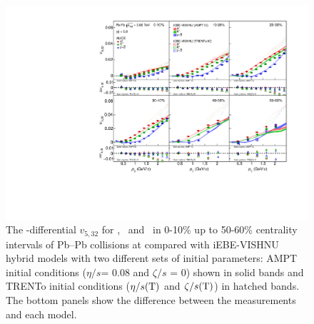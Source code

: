 \documentclass[ALICE,manyauthors]{cernphprep}
\begin{document}
\begin{figure}[h]
\begin{center}
\includegraphics[scale=0.73]{figures/model/TrentoAndAMPT_v523_gap00_PID2.pdf}
\end{center}
\caption{The \pT-differential $v_{5,32}$ for \pion, \kaon~and \proton~in 0-10\% up to 50-60\% centrality intervals of Pb--Pb collisions at \sNN compared with iEBE-VISHNU hybrid models with two different sets of initial parameters: AMPT initial conditions ($\eta/s$= 0.08 and $\zeta/s$ = 0) shown in solid bands and TRENTo initial conditions ($\eta/s({\rm T})$ and $\zeta/s({\rm T})$) in hatched bands. The bottom panels show the difference between the measurements and each model.}
\label{v523_model}
\end{figure}
\end{document}
